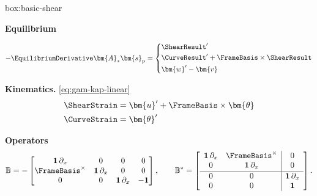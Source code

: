 \begin{ambox}{box:basic-shear}

\textbf{Equilibrium}

\begin{equation}
-\EquilibriumDerivative\bm{A}_* \bm{s}_{\mathrm{p}} = \left\{\begin{aligned}
& \ShearResult^{\prime} \\
& \CurveResult^{\prime} + \FrameBasis \times\ShearResult \\
& \bm{w}' - \bm{v}
\end{aligned}
\right.
\end{equation}

\textbf{Kinematics.} \eqref{eq:gam-kap-linear}
$$
\begin{aligned}
\ShearStrain &= \bm{u}^{\prime}+\FrameBasis  \times \bm{\theta} \\
\CurveStrain &= \bm{\theta}^{\prime}
\end{aligned}
$$

\textbf{Operators}
\[
  \mathbb{B}
  =
  -\begin{bmatrix}
    \mathbf{1}\,\partial_x & 0 & 0 & 0 \\
    \FrameBasis^{\times} & \mathbf{1}\,\partial_x & 0 & 0 \\
    0 & 0 & \mathbf{1}\,\partial_x & -\mathbf{1}
  \end{bmatrix},
  \qquad
  \mathbb{B}^*
  =
  \left[\begin{array}{cc|c}
    \mathbf{1}\,\partial_x & \FrameBasis^{\times} & 0 \\
    0 & \mathbf{1}\,\partial_x & 0 \\[0.3ex]
    \hline
    0 & 0 & \mathbf{1}\,\partial_x \\
    0 & 0 & \mathbf{1}
  \end{array}\right].
\]
\end{ambox}
